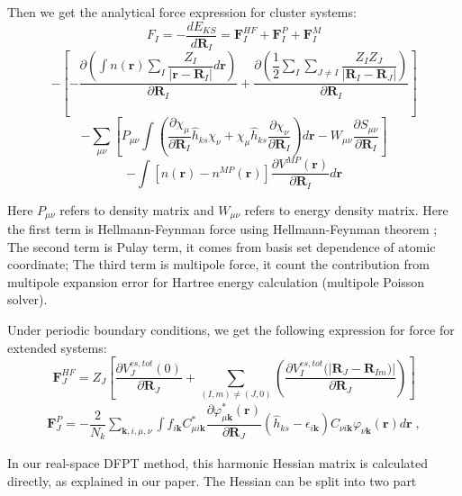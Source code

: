 Then we get the analytical force expression for cluster systems:
 \[
F_{I}= - \dfrac{d E_{KS}}{d\mathbf{R}_{I} } = \mathbf{F}_I^{HF} + \mathbf{F}_I^{P} + \mathbf{F}_I^{M}
\]
\[
-[ - \dfrac{\partial{(\int {n(\mathbf{r})  \sum_{I}\dfrac{Z_{I}}{|\mathbf{r}-\mathbf{R}_{I}|}  d\mathbf{r}})} }{ \partial{\mathbf{R}_{I}}} +
\dfrac{\partial{(\dfrac{1}{2}\sum_{I}\sum_{J\neq I}{\dfrac{Z_{I} Z_{J}}{|\mathbf{R}_{I}-\mathbf{R}_{J} |} })} }{\partial{\mathbf{R}_{I}}}  ]
\]
\[
-\sum_{\mu \nu}[ P_{\mu \nu}\int (\dfrac{\partial \chi_{\mu}}{\partial \mathbf{R}_{I} } \hat{h}_{ks} \chi_{\nu}   + \chi_{\mu} \hat{h}_{ks}  \dfrac{\partial \chi_{\nu}}{\partial \mathbf{R}_{I} } ) d\mathbf{r}    - W_{\mu\nu} \dfrac{\partial S_{\mu \nu}}{\partial \mathbf{R}_{I} } ]
\]
\begin{equation}
-\int{[n(\mathbf{r})-n^{MP}(\mathbf{r})] \dfrac{\partial{ V^{MP}(\mathbf{r})} }
{\partial{\mathbf{R}_{I}} } d\mathbf{r} 
}
\label{eq:force}
\end{equation}

Here $P_{\mu \nu}$ refers to density matrix and 
$W_{\mu \nu}$  refers to energy density matrix. 
Here the first term is Hellmann-Feynman force using Hellmann-Feynman theorem ; The second term is Pulay term, it comes from basis set dependence of atomic coordinate; The third term is multipole force, it count the contribution from multipole expansion error for Hartree energy calculation (multipole Poisson solver).


Under periodic boundary conditions, we get the following expression for force for extended systems: 
\begin{equation}
\mathbf{F}_J^{HF}= Z_{J}[\dfrac{\partial V^{es,tot}_{J}(0)} {\partial \mathbf{R}_{J} } +  \sum_{(I,m)\ne(J,0)}(
\dfrac{\partial V^{es,tot}_{I}(|\mathbf{R}_{J}-\mathbf{R}_{Im}) |} {\partial \mathbf{R}_{J} }  )  ]
\label{eq:F_HF_PBC} 
\end{equation}
\begin{align}
\mathbf{F}_J^{P} = - \dfrac{2}{N_k}\sum_{\mathbf{k},i,\mu,\nu}\int {f_{i\mathbf{k}}C^{*}_{\mu i\mathbf{k}}\dfrac{\partial \varphi_{\mu\mathbf{k}}^{*}(\mathbf{r})}{\partial  \mathbf{R}_{J} }(\hat{h}_{ks}-\epsilon_{i\mathbf{k}}) C_{\nu i\mathbf{k}}\varphi_{\nu\mathbf{k}}(\mathbf{r}) d\mathbf{r} }   \;,
\label{eq:F_pulay_PBC} 
\end{align}


In our real-space DFPT method, this harmonic Hessian matrix is calculated directly, as explained in our paper. 
The Hessian can be split into  two part

